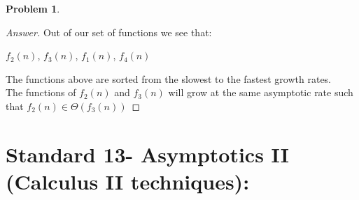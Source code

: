 \documentclass[11pt]{article}
\theoremstyle{definition}
\theoremstyle{definition}
\newtheorem{required}{Problem}
\theoremstyle{definition}
\begin{document}
\begin{required}
\begin{enumerate} [label=(\alph*)]
\begin{proof}[Answer]
Out of our set of functions we see that:
\begin{center}
$f_2(n)$, $f_3(n)$, $f_1(n)$, $f_4(n)$
\end{center}
The functions above are sorted from the slowest to the fastest growth rates. \\
The functions of $f_2(n)$ and $f_3(n)$ will grow at the same asymptotic rate such that $f_2(n) \in \Theta(f_3(n))$
    \end{proof}
\end{enumerate}

\end{required}

\newpage
\section{Standard 13- Asymptotics II (Calculus II techniques): }
\end{document}
